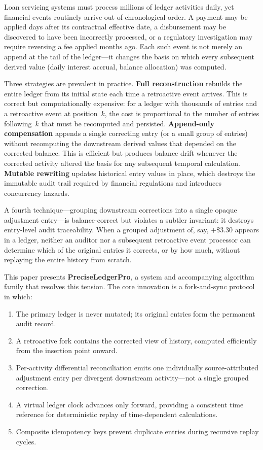 \documentclass[11pt,letterpaper]{article}
\begin{document}
Loan servicing systems must process millions of ledger activities daily,
yet financial events routinely arrive out of chronological order. A
payment may be applied days after its contractual effective date, a
disbursement may be discovered to have been incorrectly processed, or a
regulatory investigation may require reversing a fee applied months ago.
Each such event is not merely an append at the tail of the ledger---it
changes the basis on which every subsequent derived value (daily
interest accrual, balance allocation) was computed.

Three strategies are prevalent in practice. \textbf{Full
reconstruction} rebuilds the entire ledger from its initial state each
time a retroactive event arrives. This is correct but computationally
expensive: for a ledger with thousands of entries and a retroactive
event at position~$k$, the cost is proportional to the number of
entries following~$k$ that must be recomputed and persisted.
\textbf{Append-only compensation} appends a single correcting entry (or
a small group of entries) without recomputing the downstream derived
values that depended on the corrected balance. This is efficient but
produces balance drift whenever the corrected activity altered the basis
for any subsequent temporal calculation. \textbf{Mutable rewriting}
updates historical entry values in place, which destroys the immutable
audit trail required by financial regulations and introduces concurrency
hazards.

A fourth technique---grouping downstream corrections into a single
opaque adjustment entry---is balance-correct but violates a subtler
invariant: it destroys entry-level audit traceability. When a grouped
adjustment of, say, $+\$3.30$ appears in a ledger, neither an auditor
nor a subsequent retroactive event processor can determine which of the
original entries it corrects, or by how much, without replaying the
entire history from scratch.

This paper presents \textbf{PreciseLedgerPro}, a system and
accompanying algorithm family that resolves this tension. The core
innovation is a fork-and-sync protocol in which:
\begin{enumerate}[label=\arabic*.]
  \item The primary ledger is never mutated; its original entries form
        the permanent audit record.
  \item A retroactive fork contains the corrected view of history,
        computed efficiently from the insertion point onward.
  \item Per-activity differential reconciliation emits one individually
        source-attributed adjustment entry per divergent downstream
        activity---not a single grouped correction.
  \item A virtual ledger clock advances only forward, providing a
        consistent time reference for deterministic replay of
        time-dependent calculations.
  \item Composite idempotency keys prevent duplicate entries during
        recursive replay cycles.
\end{enumerate}
\end{document}
